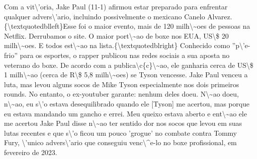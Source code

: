 \documentclass{article}%
\begin{document}
Com a vit\textbackslash{}'oria, Jake Paul (11{-}1) afirmou estar preparado para enfrentar qualquer advers\textbackslash{}'ario, incluindo possivelmente o mexicano Canelo Alvarez. \{\textbackslash{}textquotedblleft\}Esse foi o maior evento, mais de 120 milh\textbackslash{}\textasciitilde{}oes de pessoas na Netflix. Derrubamos o site. O maior port\textbackslash{}\textasciitilde{}ao de boxe nos EUA, US\textbackslash{}\$ 20 milh\textbackslash{}\textasciitilde{}oes. E todos est\textbackslash{}\textasciitilde{}ao na lista.\{\textbackslash{}textquotedblright\} Conhecido como ''p\textbackslash{}'e{-}frio'' para os esportes, o rapper publicou nas redes sociais a sua aposta no veterano do boxe. De acordo com a publica\textbackslash{}c\{c\}\textbackslash{}\textasciitilde{}ao, ele ganharia cerca de US\textbackslash{}\$ 1 milh\textbackslash{}\textasciitilde{}ao (cerca de R\textbackslash{}\$ 5,8 milh\textbackslash{}\textasciitilde{}oes) se Tyson vencesse. Jake Paul venceu a luta, mas levou alguns socos de Mike Tyson especialmente nos dois primeiros rounds. No entanto, o ex{-}youtuber garante: nenhum deles doeu.\newline%
\newline%
N\textbackslash{}\textasciitilde{}ao doeu, n\textbackslash{}\textasciitilde{}ao, eu s\textbackslash{}'o estava desequilibrado quando ele {[}Tyson{]} me acertou, mas porque eu estava mandando um gancho e errei. Meu queixo estava aberto e ent\textbackslash{}\textasciitilde{}ao ele me acertou\newline%
\newline%
Jake Paul disse n\textbackslash{}\textasciitilde{}ao ter sentido dor nos socos que levou em suas lutas recentes e que s\textbackslash{}'o ficou um pouco 'grogue' no combate contra Tommy Fury, \textbackslash{}'unico advers\textbackslash{}'ario que conseguiu venc\textbackslash{}\^{}e{-}lo no boxe profissional, em fevereiro de 2023.\newline%
\newline%

%
\end{document}
